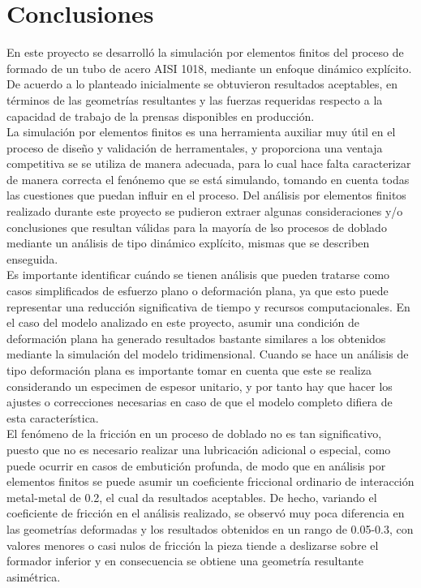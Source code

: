 \chapter*{Conclusiones}


En este proyecto se desarrolló la simulación por elementos finitos del proceso de formado 
de un tubo de acero AISI 1018, mediante un enfoque dinámico explícito. De acuerdo a lo 
planteado inicialmente se obtuvieron resultados aceptables, en términos de las geometrías 
resultantes y las fuerzas requeridas respecto a la capacidad de trabajo de la prensas 
disponibles en producción.\\

La simulación por elementos finitos es una herramienta auxiliar muy útil en el proceso de 
diseño y validación de herramentales, y proporciona una ventaja competitiva se se utiliza 
de manera adecuada, para lo cual hace falta caracterizar de manera correcta el fenónemo 
que se está simulando, tomando en cuenta todas las cuestiones que puedan influir 
en el proceso. Del análisis por elementos finitos realizado durante este proyecto 
se pudieron extraer algunas consideraciones y/o conclusiones que resultan válidas 
para la mayoría de lso procesos de doblado mediante un análisis de tipo dinámico explícito, mismas 
que se describen enseguida.\\

Es importante identificar cuándo se tienen análisis que pueden tratarse como casos simplificados 
de esfuerzo plano o deformación plana, ya que esto puede representar una reducción significativa 
de tiempo y recursos computacionales. En el caso del modelo analizado en este proyecto, asumir 
una condición de deformación plana ha generado resultados bastante similares a los obtenidos 
mediante la simulación del modelo tridimensional. Cuando se hace un análisis de tipo 
deformación plana es importante tomar en cuenta que este se realiza considerando un especimen 
de espesor unitario, y por tanto hay que hacer los ajustes o correcciones necesarias en 
caso de que el modelo completo difiera de esta característica. \\

El fenómeno de la fricción en un proceso de doblado no es tan significativo, puesto que no 
es necesario realizar una lubricación adicional o especial, como puede ocurrir en casos 
de embutición profunda, de modo que en análisis por elementos finitos se puede asumir 
un coeficiente friccional ordinario de interacción metal-metal de 0.2, el cual da resultados 
aceptables. De hecho, variando el coeficiente de fricción en el análisis realizado, se observó 
muy poca diferencia en las geometrías deformadas y los resultados obtenidos en un rango de 0.05-0.3, 
con valores menores o casi nulos de fricción la pieza tiende a deslizarse sobre el formador 
inferior y en consecuencia se obtiene una geometría resultante asimétrica.\\

